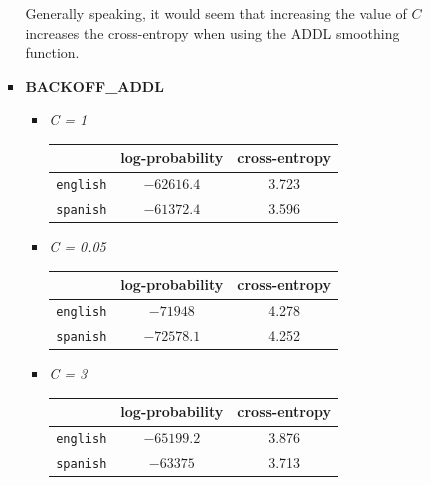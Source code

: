 \documentclass[11pt]{article}
\begin{document}
\begin{enumerate}
\begin{enumerate}[label=(\alph*)]
\begin{itemize}
\begin{itemize}
\begin{center}
\begin{tabular}{| r || c | c |}
				\end{tabular}\end{center}

			\end{itemize} \vspace{8pt}

			Generally speaking, it would seem that increasing the value of $C$ increases the cross-entropy when using the ADDL smoothing function. 
			\vspace{8pt} \\

		\item[] \hspace{-24pt} \textbf{BACKOFF\_ADDL}
			\begin{itemize}
			\item[] \hspace{-24pt} \textit{C = 1} 	 \vspace{4pt}
				\begin{center}\begin{tabular}{| r || c | c |}
				\hline
									& log-probability	& cross-entropy \\
				\hline \hline
				\texttt{english}	& $-62616.4$		& 3.723			\\
				\texttt{spanish}	& $-61372.4$		& 3.596			\\
				\hline
				
				\end{tabular}\end{center}
				
			\item[] \hspace{-24pt} \textit{C = 0.05} \vspace{4pt}
				\begin{center}\begin{tabular}{| r || c | c |}
				\hline
									& log-probability	& cross-entropy \\
				\hline \hline
				\texttt{english}	& $-71948$			& 4.278			\\
				\texttt{spanish}	& $-72578.1$		& 4.252			\\
				\hline
				
				\end{tabular}\end{center}

			\item[] \hspace{-24pt} \textit{C = 3} 	 \vspace{4pt} \\
				\begin{center}\begin{tabular}{| r || c | c |}
				\hline
									& log-probability	& cross-entropy \\
				\hline \hline
				\texttt{english}	& $-65199.2$		& 3.876			\\
				\texttt{spanish}	& $-63375$			& 3.713			\\
				\hline
				

\end{tabular}
\end{center}
\end{itemize}
\end{itemize}
\end{enumerate}
\end{enumerate}
\end{document}
